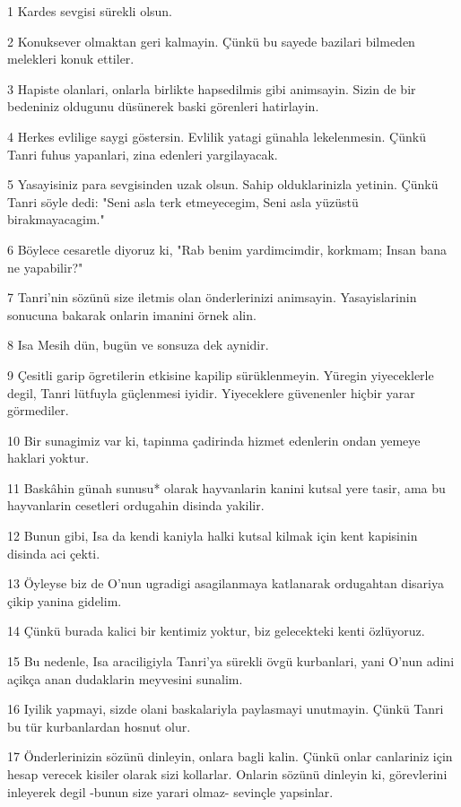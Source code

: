 \par 1 Kardes sevgisi sürekli olsun.
\par 2 Konuksever olmaktan geri kalmayin. Çünkü bu sayede bazilari bilmeden melekleri konuk ettiler.
\par 3 Hapiste olanlari, onlarla birlikte hapsedilmis gibi animsayin. Sizin de bir bedeniniz oldugunu düsünerek baski görenleri hatirlayin.
\par 4 Herkes evlilige saygi göstersin. Evlilik yatagi günahla lekelenmesin. Çünkü Tanri fuhus yapanlari, zina edenleri yargilayacak.
\par 5 Yasayisiniz para sevgisinden uzak olsun. Sahip olduklarinizla yetinin. Çünkü Tanri söyle dedi: "Seni asla terk etmeyecegim, Seni asla yüzüstü birakmayacagim."
\par 6 Böylece cesaretle diyoruz ki, "Rab benim yardimcimdir, korkmam; Insan bana ne yapabilir?"
\par 7 Tanri'nin sözünü size iletmis olan önderlerinizi animsayin. Yasayislarinin sonucuna bakarak onlarin imanini örnek alin.
\par 8 Isa Mesih dün, bugün ve sonsuza dek aynidir.
\par 9 Çesitli garip ögretilerin etkisine kapilip sürüklenmeyin. Yüregin yiyeceklerle degil, Tanri lütfuyla güçlenmesi iyidir. Yiyeceklere güvenenler hiçbir yarar görmediler.
\par 10 Bir sunagimiz var ki, tapinma çadirinda hizmet edenlerin ondan yemeye haklari yoktur.
\par 11 Baskâhin günah sunusu* olarak hayvanlarin kanini kutsal yere tasir, ama bu hayvanlarin cesetleri ordugahin disinda yakilir.
\par 12 Bunun gibi, Isa da kendi kaniyla halki kutsal kilmak için kent kapisinin disinda aci çekti.
\par 13 Öyleyse biz de O'nun ugradigi asagilanmaya katlanarak ordugahtan disariya çikip yanina gidelim.
\par 14 Çünkü burada kalici bir kentimiz yoktur, biz gelecekteki kenti özlüyoruz.
\par 15 Bu nedenle, Isa araciligiyla Tanri'ya sürekli övgü kurbanlari, yani O'nun adini açikça anan dudaklarin meyvesini sunalim.
\par 16 Iyilik yapmayi, sizde olani baskalariyla paylasmayi unutmayin. Çünkü Tanri bu tür kurbanlardan hosnut olur.
\par 17 Önderlerinizin sözünü dinleyin, onlara bagli kalin. Çünkü onlar canlariniz için hesap verecek kisiler olarak sizi kollarlar. Onlarin sözünü dinleyin ki, görevlerini inleyerek degil -bunun size yarari olmaz- sevinçle yapsinlar.
